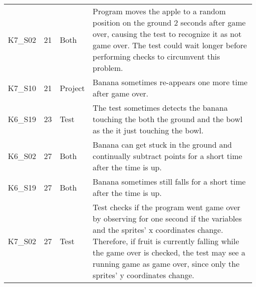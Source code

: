 \begin{table}[htpb]
{\begin{tabular}{lrlp{11.25cm}}
        K7\_S02 & 21   & Both    & Program moves the apple to a random position on the ground 2 seconds after game over, causing the test to recognize it as not game over.
                                   The test could wait longer before performing checks to circumvent this problem. \\
        K7\_S10 & 21   & Project & Banana sometimes re-appears one more time after game over. \\
        K6\_S19 & 23   & Test    & The test sometimes detects the banana touching the both the ground and the bowl as the it just touching the bowl. \\

        K6\_S02 & 27   & Both    & Banana can get stuck in the ground and continually subtract points for a short time after the time is up. \\
        K6\_S19 & 27   & Both    & Banana sometimes still falls for a short time after the time is up. \\
        K7\_S02 & 27   & Test    & Test checks if the program went game over by observing for one second if the variables and the sprites' x coordinates change.
                                   Therefore, if fruit is currently falling while the game over is checked, the test may see a running game as game over, since only the sprites' y coordinates change. \\
        \bottomrule
    \end{tabular}
    }

    \bigskip


\end{table}
